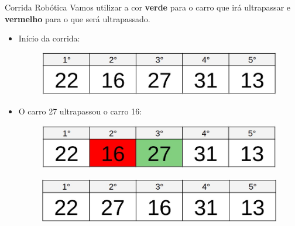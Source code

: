 \documentclass{beamer}
\begin{document}
\begin{frame}{Corrida Robótica}
Vamos utilizar a cor \textbf{verde} para o carro que irá ultrapassar e \textbf{vermelho} para o que será ultrapassado.
\begin{itemize}


    \item Início da corrida:
        \begin{figure}[ht]
        \centering
        \includegraphics[width=.6\textwidth]{1.jpeg}
        \label{fig:exampleFig2}
        \end{figure}
    \item O carro 27 ultrapassou o carro 16:
        \begin{figure}[ht]
        \centering
        \includegraphics[width=.6\textwidth]{2.jpeg}
        \label{fig:exampleFig2}
        \end{figure}
        \begin{figure}[ht]
        \centering
        \includegraphics[width=.6\textwidth]{3.jpeg}
        \label{fig:exampleFig2}
        \end{figure}
\end{itemize}
\end{frame}
\end{document}
